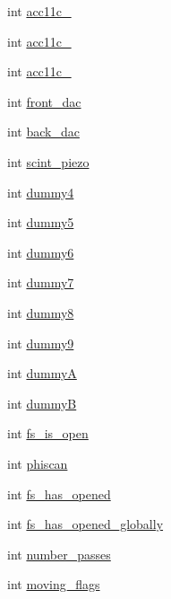 \begin{DoxyCompactItemize}
\item 
int \hyperlink{structmd2StatusStruct_a20a15620e12888f61c0aed1e47e97932}{acc11c\-\_}
\item 
int \hyperlink{structmd2StatusStruct_ab09c1342dc12052b8f5b35f78ef95000}{acc11c\-\_}
\item 
int \hyperlink{structmd2StatusStruct_ac7029100738dcc3f09a8b0d1d3d1d353}{acc11c\-\_}
\item 
int \hyperlink{structmd2StatusStruct_a3be73c48b09190241a2bcb801af5b97c}{front\-\_\-dac}
\item 
int \hyperlink{structmd2StatusStruct_a33ce490348c8de255cf49b96469d3d4e}{back\-\_\-dac}
\item 
int \hyperlink{structmd2StatusStruct_a031be48adfa016c637d6eae49054c435}{scint\-\_\-piezo}
\item 
int \hyperlink{structmd2StatusStruct_adaa01db9cf77d95756bc3156fb702600}{dummy4}
\item 
int \hyperlink{structmd2StatusStruct_af4f8869f8954c6162cae80000c54694f}{dummy5}
\item 
int \hyperlink{structmd2StatusStruct_a864a2234ede061ec2380230ebf29ce70}{dummy6}
\item 
int \hyperlink{structmd2StatusStruct_a91f38d814222edeffa67a6a3ab61f5d6}{dummy7}
\item 
int \hyperlink{structmd2StatusStruct_a17f44367cfa4c66ec3ee481863ef4960}{dummy8}
\item 
int \hyperlink{structmd2StatusStruct_aa5aadda5a5cb98c6028f8b45e16cd084}{dummy9}
\item 
int \hyperlink{structmd2StatusStruct_a9fc7dc802d00c22463dd7ddd531e06d7}{dummy\-A}
\item 
int \hyperlink{structmd2StatusStruct_aab597be69a8dcc140778d9aeb8a50eee}{dummy\-B}
\item 
int \hyperlink{structmd2StatusStruct_aca3722c109e6646bd41fb269a32261f2}{fs\-\_\-is\-\_\-open}
\item 
int \hyperlink{structmd2StatusStruct_abe3d4a61a15f54590b061e23b45e659c}{phiscan}
\item 
int \hyperlink{structmd2StatusStruct_ab961c2ba24a1a8c95a88dec25319e712}{fs\-\_\-has\-\_\-opened}
\item 
int \hyperlink{structmd2StatusStruct_ac95696b7ed35ccfdfb6aeeee879bdb65}{fs\-\_\-has\-\_\-opened\-\_\-globally}
\item 
int \hyperlink{structmd2StatusStruct_ab3da523bad7b82c1d27780caa24a8b92}{number\-\_\-passes}
\item 
int \hyperlink{structmd2StatusStruct_aac82f8e97fa39ea9be7823dd1d308986}{moving\-\_\-flags}
\end{DoxyCompactItemize}


